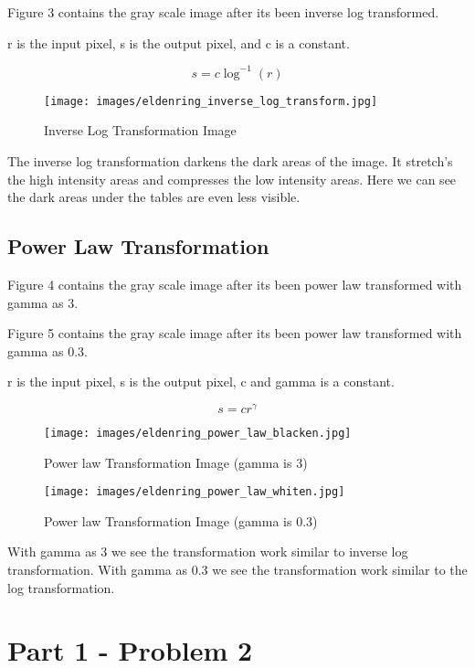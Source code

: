 \documentclass[conference]{IEEEtran}
\begin{document}
Figure 3 contains the gray scale image after its been inverse log transformed.

r is the input pixel, s is the output pixel, and c is a constant.

\begin{equation}
s=c\log^{-1} (r)
\end{equation}

\begin{figure}[htbp]
    \centering
    \texttt{[image: images/eldenring\_inverse\_log\_transform.jpg]}
    \caption{Inverse Log Transformation Image}
\end{figure}

The inverse log transformation darkens the dark areas of the image. It stretch's the high intensity areas and compresses the low intensity areas. Here we can see the dark areas under the tables are even less visible.

\subsection{Power Law Transformation}

Figure 4 contains the gray scale image after its been power law transformed with gamma as 3.

Figure 5 contains the gray scale image after its been power law transformed with gamma as 0.3.

\hfill

r is the input pixel, s is the output pixel, c and gamma is a constant.

\begin{equation}
s=cr^\gamma
\end{equation}

\begin{figure}[htbp]
    \centering
    \texttt{[image: images/eldenring\_power\_law\_blacken.jpg]}
    \caption{Power law Transformation Image (gamma is 3)}
    \centering
    \texttt{[image: images/eldenring\_power\_law\_whiten.jpg]}
    \caption{Power law Transformation Image (gamma is 0.3)}
\end{figure}

With gamma as 3 we see the transformation work similar to inverse log transformation. With gamma as 0.3 we see the transformation work similar to the log transformation.

\section*{Part 1 - Problem 2}
\end{document}
